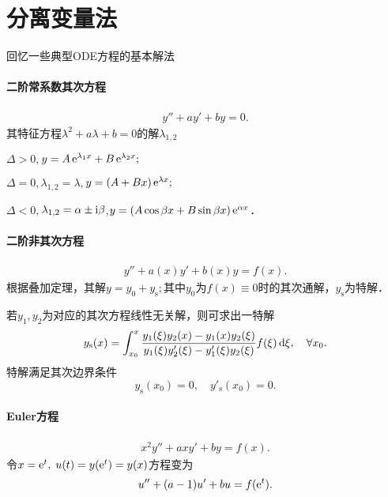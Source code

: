 \section{分离变量法}
回忆一些典型ODE方程的基本解法
\paragraph{二阶常系数其次方程}
\begin{align}
	y''+ay'+by=0.
\end{align}
其特征方程$\lambda^2+a\lambda+b=0$的解$\lambda_{1,2}$
\begin{compactenum}[I.]
	\item $\Delta>0,$\quad$y=A\mathop{}\!\mathrm{e}^{\lambda_1x}+B\mathop{}\!\mathrm{e}^{\lambda_2x};$
	\item $\Delta=0,$\quad$\lambda_{1,2}=\lambda,$\quad$y=(A+Bx)\mathop{}\!\mathrm{e}^{\lambda x};$
	\item $\Delta<0,$\quad$\lambda_{1,2}=\alpha\pm\mathrm{i}\beta$,\quad$y=(A\cos\beta x+B\sin\beta x)\mathop{}\!\mathrm{e}^{\alpha x}$．
\end{compactenum}
\paragraph{二阶非其次方程}
\begin{align}
	y''+a(x)y'+b(x)y=f(x).
\end{align}
根据叠加定理，其解$y=y_0+y_\mathrm s;$其中$y_0$为$f(x)\equiv 0$时的其次通解，$y_\mathrm s$为特解．

若$y_1,y_2$为对应的其次方程线性无关解，则可求出一特解
\begin{align}\label{General to Particular Solution}
	y_\mathrm s(x)=\int_{x_0}^x\frac{y_1(\xi)y_2(x)-y_1(x)y_2(\xi)}{y_1(\xi)y_2'(\xi)-y_1'(\xi)y_2(\xi)}f(\xi)\mathop{}\!\mathrm{d} \xi,\quad\forall x_0.
\end{align}
特解满足其次边界条件
\[y_\mathrm s(x_0)=0,\quad y'_\mathrm s(x_0)=0.\]
\paragraph{Euler方程}
\begin{align}
	x^2y''+axy'+by=f(x).
\end{align}
令$x=\mathop{}\!\mathrm{e}^ t,\;u(t)=y(\mathop{}\!\mathrm{e}^ t)=y(x)$方程变为
\begin{align}
	u''+(a-1)u'+bu=f(\mathop{}\!\mathrm{e}^ t).
\end{align}
\clearpage
